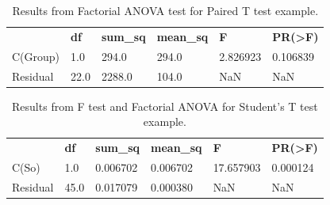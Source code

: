 {\begin{table}[htpb]
  \begin{center}
    \caption{Results from Factorial ANOVA test for Paired T test example.}
    \begin{tabularx}{\linewidth}{XXXXXX}
       & \textbf{df} & \textbf{sum\_sq} & \textbf{mean\_sq} & \textbf{F} & \textbf{PR(>F)} \\
        C(Group) &  1.0 &  294.0  &  294.0 & 2.826923 & 0.106839 \\
        Residual & 22.0 & 2288.0  &  104.0    &   NaN   &    NaN \\
    \end{tabularx}
  \end{center}
  \label{tab:paired_t_fanova}
\end{table}


\begin{table}[htpb]
  \begin{center}
    \caption{Results from F test and Factorial ANOVA for Student's T test example.}
    \begin{tabularx}{\linewidth}{XXXXXX}
       & \textbf{df} & \textbf{sum\_sq} & \textbf{mean\_sq} & \textbf{F} & \textbf{PR(>F)} \\
        C(So)   &   1.0 &  0.006702 &  0.006702 & 17.657903 & 0.000124 \\
        Residual & 45.0 & 0.017079 & 0.000380    &    NaN     &  NaN \\
    \end{tabularx}
  \end{center}
  \label{tab:students_t_f_test_and_fanova}
\end{table}
}

